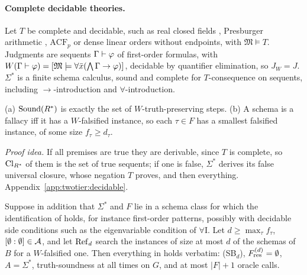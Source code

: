 \paragraph{Complete decidable theories.} Let $T$ be complete and decidable, such as real closed fields \citep{tarski1951decision}, Presburger arithmetic \citep{presburger1929vollstandigkeit}, $\mathrm{ACF}_p$ or dense linear orders without endpoints, with $\mathfrak M\models T$. Judgments are sequents $\Gamma\vdash\varphi$ of first-order formulas, with $W(\Gamma\vdash\varphi)=[\mathfrak M\models\forall\bar x(\bigwedge\Gamma\to\varphi)]$, decidable by quantifier elimination, so $J_W=J$. $\Sigma^*$ is a finite schema calculus, sound and complete for $T$-consequence on sequents, including $\to$-introduction and $\forall$-introduction.

\begin{lemma}\label{lem:twotier:complete}
\textup{(a)} $\mathrm{Sound}(R^{*})$ is exactly the set of $W$-truth-preserving steps.
\textup{(b)} A schema is a fallacy iff it has a $W$-falsified instance, so each $\tau\in F$ has a smallest falsified instance, of some size $f_\tau\ge d_\tau$.
\end{lemma}

\noindent\emph{Proof idea.} If all premises are true they are derivable, since $T$ is complete, so $\mathrm{Cl}_{R^{*}}$ of them is the set of true sequents; if one is false, $\Sigma^*$ derives its false universal closure, whose negation $T$ proves, and then everything. Appendix~\ref{app:twotier:decidable}.

\begin{corollary}\label{cor:twotier:decidable}
Suppose in addition that $\Sigma^*$ and $F$ lie in a schema class for which the identification of  holds, for instance first-order patterns, possibly with decidable side conditions such as the eigenvariable condition of $\forall$I. Let $d\ge\max_\tau f_\tau$, $[\emptyset : \emptyset]\in\mathcal{A}$, and let $\mathrm{Ref}_d$ search the instances of size at most $d$ of the schemas of $B$ for a $W$-falsified one. Then everything in  holds verbatim: (SB$_d$), $F^{(d)}_{\mathrm{res}}=\emptyset$, $A=\Sigma^*$, truth-soundness at all times on $G$, and at most $|F|+1$ oracle calls.
\end{corollary}

